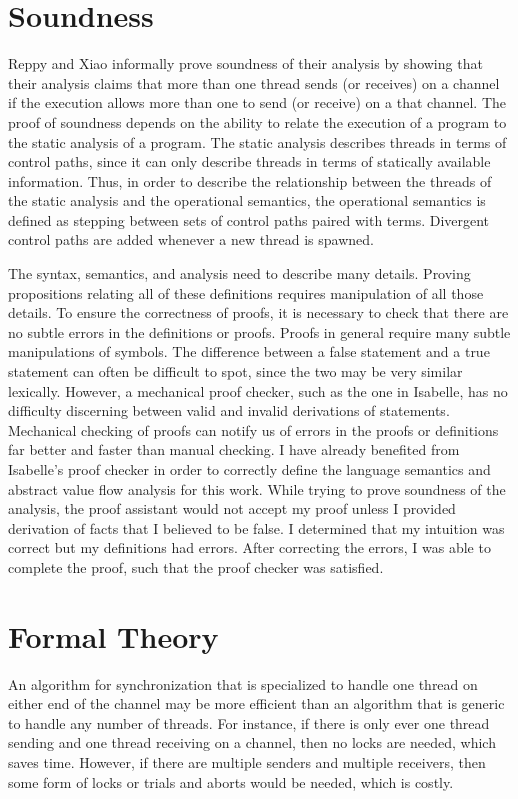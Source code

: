 \documentclass{article}
\begin{document}
\section{Soundness}
Reppy and Xiao informally prove soundness of their analysis by showing that their analysis
claims that more than one thread sends (or receives) on a channel if the execution allows more
than one to send (or receive) on a that channel.  The proof of soundness depends on the
ability to relate the execution of a program to the static analysis of a program.  The static
analysis describes threads in terms of control paths, since it can only describe threads in
terms of statically available information. Thus, in order to describe the relationship between
the threads of the static analysis and the operational semantics, the operational semantics is
defined as stepping between sets of control paths paired with terms.  Divergent control paths
are added whenever a new thread is spawned.

The syntax, semantics, and analysis need to describe many details.  Proving propositions
relating all of these definitions requires manipulation of all those details.  To ensure the
correctness of proofs, it is necessary to check that there are no subtle errors in the
definitions or proofs.  Proofs in general require many subtle manipulations of symbols.  The
difference between a false statement and a true statement can often be difficult to spot, since
the two may be very similar lexically.  However, a mechanical proof checker, such as the one in
Isabelle, has no difficulty discerning between valid and invalid derivations of statements.
Mechanical checking of proofs can notify us of errors in the proofs or definitions far better
and faster than manual checking.  I have already benefited from Isabelle's proof checker in
order to correctly define the language semantics and abstract value flow analysis for this
work.  While trying to prove soundness of the analysis, the proof assistant would not accept my
proof unless I provided derivation of facts that I believed to be false.  I determined that my
intuition was correct but my definitions had errors. After correcting the errors, I was able
to complete the proof, such that the proof checker was satisfied.

\section{Formal Theory}
An algorithm for synchronization that is specialized to handle one thread on
either end of the channel may be more
efficient than an algorithm that is generic to handle any number of threads.
For instance, if there
is only ever one thread sending and one thread receiving on a channel, then no locks are
needed, which saves time.  However, if there are multiple senders and multiple receivers, then
some form of locks or trials and aborts would be needed, which is costly.
\end{document}
